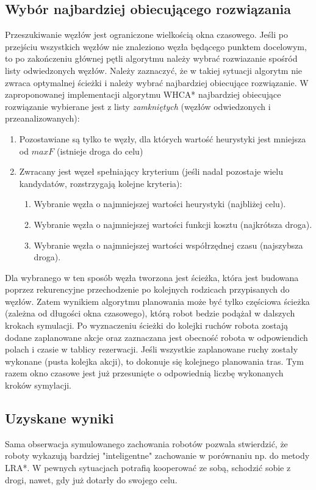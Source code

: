 \subsection{Wybór najbardziej obiecującego rozwiązania}
Przeszukiwanie węzłów jest ograniczone wielkością okna czasowego. Jeśli po przejściu wszystkich węzłów nie znaleziono węzła będącego punktem docelowym, to po zakończeniu głównej pętli algorytmu należy wybrać rozwiazanie spośród listy odwiedzonych węzłów.
Należy zaznaczyć, że w takiej sytuacji algorytm nie zwraca optymalnej ścieżki i należy wybrać najbardziej obiecujące rozwiązanie.
W zaproponowanej implementacji algorytmu WHCA* najbardziej obiecujące rozwiązanie wybierane jest z listy {\it zamkniętych} (węzłów odwiedzonych i przeanalizowanych):
\begin{enumerate}
	\item Pozostawiane są tylko te węzły, dla których wartość heurystyki jest mniejsza od $maxF$ (istnieje droga do celu)
	\item Zwracany jest węzeł spełniający kryterium (jeśli nadal pozostaje wielu kandydatów, rozstrzygają kolejne kryteria):
	\begin{enumerate}
		\item Wybranie węzła o najmniejszej wartości heurystyki (najbliżej celu).
		\item Wybranie węzła o najmniejszej wartości funkcji kosztu (najkrótsza droga).
		\item Wybranie węzła o najmniejszej wartości współrzędnej czasu (najszybsza droga).
	\end{enumerate}
\end{enumerate}

Dla wybranego w ten sposób węzła tworzona jest ścieżka, która jest budowana poprzez rekurencyjne przechodzenie po kolejnych rodzicach przypisanych do węzłów.
Zatem wynikiem algorytmu planowania może być tylko częściowa ścieżka (zależna od długości okna czasowego), którą robot bedzie podążał w dalszych krokach symulacji.
Po wyznaczeniu ścieżki do kolejki ruchów robota zostają dodane zaplanowane akcje oraz zaznaczana jest obecność robota w odpowiendich polach i czasie w tablicy rezerwacji.
Jeśli wszystkie zaplanowane ruchy zostały wykonane (pusta kolejka akcji), to dokonuje się kolejnego planowania tras.
Tym razem okno czasowe jest już przesunięte o odpowiednią liczbę wykonanych kroków symylacji.

\subsection{Uzyskane wyniki}
Sama obserwacja symulowanego zachowania robotów pozwala stwierdzić, że roboty wykazują bardziej "inteligentne" zachowanie w porównaniu np. do metody LRA*. W pewnych sytuacjach potrafią kooperować ze sobą, schodzić sobie z drogi, nawet, gdy już dotarły do swojego celu.

